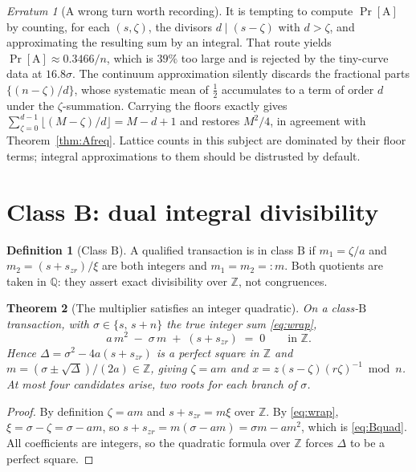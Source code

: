 \documentclass[11pt,a4paper]{article}
\theoremstyle{plain}
\newtheorem{theorem}{Theorem}
\theoremstyle{definition}
\newtheorem{definition}[theorem]{Definition}
\theoremstyle{remark}
\newtheorem{erratum}{Erratum}
\newcommand{\Zz}{\mathbb{Z}}
\newcommand{\Pro}{\Pr}
\newcommand{\szr}{s_{zr}}
\newcommand{\clA}{\mathrm{A}}
\newcommand{\clB}{\mathrm{B}}
\begin{document}
\begin{erratum}[A wrong turn worth recording]\label{err:divisor}
It is tempting to compute $\Pro[\clA]$ by counting, for each $(s,\zeta)$, the divisors
$d \mid (s-\zeta)$ with $d > \zeta$, and approximating the resulting sum by an integral. That
route yields $\Pro[\clA] \approx 0.3466/n$, which is $39\%$ too large and is rejected by the
tiny-curve data at $16.8\sigma$. The continuum approximation silently discards the fractional
parts $\{(n-\zeta)/d\}$, whose systematic mean of $\tfrac12$ accumulates to a term of order $d$
under the $\zeta$-summation. Carrying the floors exactly gives
$\sum_{\zeta=0}^{d-1}\lfloor (M-\zeta)/d\rfloor = M-d+1$ and restores $M^{2}/4$, in agreement with
Theorem~\ref{thm:Afreq}. Lattice counts in this subject are dominated by their floor terms;
integral approximations to them should be distrusted by default.
\end{erratum}

\section{Class B: dual integral divisibility}\label{sec:B}

\begin{definition}[Class $\clB$]\label{def:B}
A qualified transaction is in class $\clB$ if $m_1 = \zeta/a$ and $m_2 = (s+\szr)/\xi$ are both
integers and $m_1 = m_2 =: m$. Both quotients are taken in $\mathbb{Q}$: they assert exact
divisibility over $\Zz$, not congruences.
\end{definition}

\begin{theorem}[The multiplier satisfies an integer quadratic]\label{thm:Bquad}
On a class-$\clB$ transaction, with $\sigma \in \{s,\,s+n\}$ the true integer sum \eqref{eq:wrap},
\begin{equation}\label{eq:Bquad}
  a\,m^{2} \;-\; \sigma\,m \;+\; (s+\szr) \;=\; 0 \qquad\text{in } \Zz .
\end{equation}
Hence $\Delta = \sigma^{2} - 4a(s+\szr)$ is a perfect square in $\Zz$ and
$m = (\sigma \pm \sqrt{\Delta})/(2a) \in \Zz$, giving $\zeta = am$ and
$x = z(s-\zeta)(r\zeta)^{-1}\bmod n$. At most four candidates arise, two roots for each branch of
$\sigma$.
\end{theorem}

\begin{proof}
By definition $\zeta = am$ and $s + \szr = m\xi$ over $\Zz$. By \eqref{eq:wrap},
$\xi = \sigma - \zeta = \sigma - am$, so $s+\szr = m(\sigma - am) = \sigma m - am^{2}$, which is
\eqref{eq:Bquad}. All coefficients are integers, so the quadratic formula over $\Zz$ forces
$\Delta$ to be a perfect square.
\end{proof}
\end{document}
